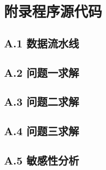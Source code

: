 \section*{附录\quad 程序源代码}

\subsection*{A.1 数据流水线}


\subsection*{A.2 问题一求解}


\subsection*{A.3 问题二求解}


\subsection*{A.4 问题三求解}


\subsection*{A.5 敏感性分析}

